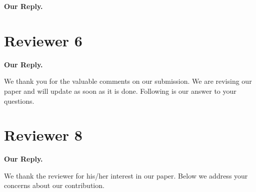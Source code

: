 \documentclass{article} %
\begin{document}
\textbf{Our Reply.}

\section{Reviewer 6}
\vspace{-0.1in}

\textbf{Our Reply.}

We thank you for the valuable comments on our submission. We are revising our paper and will update as soon as it is done. Following is our answer to your questions.






\section{Reviewer 8}
\vspace{-0.1in}



\textbf{Our Reply.}

We thank the reviewer for his/her interest in our paper. Below we address your concerns about our contribution. 
\end{document}
